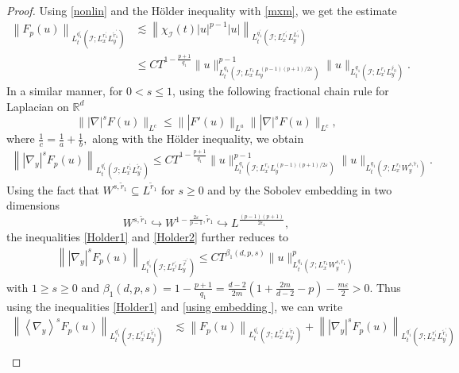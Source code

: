 \documentclass[a4paper,11pt, reqno]{amsart}
\theoremstyle{definition}
\theoremstyle{remark}
\numberwithin{equation}{section}
\begin{document}
\begin{proof}
        Using \eqref{nonlin}  and the H\"older inequality with \eqref{mxm}, we get the estimate 
		\begin{align}\label{Holder1}\nonumber
			\left\|F_p(u)\right\|_{L_t^{q_1^{\prime}}\left(\mathcal{I} ; L_x^{r_1^{\prime}} L_y^{\tilde{r}_1^{\prime}}\right)} & \lesssim\left\|\chi_{\mathcal{I}}(t)|u|^{p-1} | u|\right\|_{L_t^{q_1^{\prime}}\left(\mathcal{I} ; L_x^{r_1^{\prime}} L_y^{L_1^{\prime}}\right)} \\
			&\leq C T^{1-\frac{p+1}{q_1}}\|u\|_{L_t^{q_1}\left(\mathcal{I} ; L_x^{r_1} L_y^{(p-1)(p+1) / 2 \varepsilon}\right)}^{p-1}\|u\|_{L_t^{q_1}\left(\mathcal{I} ; L_x^{r_1} L_y^{\tilde{r_0}}\right)}.
		\end{align}
	In a similar manner, for $0<s \leq 1$, using the following fractional chain rule for Laplacian on $\mathbb{R}^d$ $$\||\nabla|^s F(u)\|_{L^c}\leq \||F'(u)\|_{L^a}\||\nabla|^sF(u)\|_{L^c},$$
    where $\frac{1}{c}=\frac{1}{a}+\frac{1}{b},$ along with the H\"older inequality,  we obtain
		\begin{align}\label{Holder2}
			\left\|\left|\nabla_y\right|^s F_p(u)\right\|_{L_t^{q_1^{\prime}}\left(\mathcal{I} ; L_x^{r_1^{\prime}} L_y^{\tilde{r}_1}\right)} \leq C T^{1-\frac{p+1}{q_1}}\|u\|_{L_t^{q_1}\left(\mathcal{I} ; L_x^{r_1} L_y^{(p-1)(p+1) / 2 \varepsilon}\right)}^{p-1}\|u\|_{L_t^{q_1}\left(\mathcal{I} ; L_x^{r_1} W_y^{s, \tilde{r}_1}\right)}.
		\end{align}
		Using the fact that  $W^{s, \widetilde{r}_1} \subseteq L^{\widetilde{r}_1}$ for $s \geq 0$ and  by  the Sobolev embedding in two dimensions
		$$
		W^{s, \widetilde{r}_1} \hookrightarrow W^{1-\frac{2 \varepsilon}{p-1}, \widetilde{r}_1} \hookrightarrow L^{\frac{(p-1)(p+1)}{2 \epsilon_1}},
		$$
		the inequalities \eqref{Holder1} and \eqref{Holder2}  further   reduces to 
		\begin{align}\label{using embedding }
			\left\||\nabla_y|^s F_p(u)\right\|_{L_t^{q_1^{\prime}}\left(\mathcal{I} ; L_x^{r_1^{\prime}} L_y^{\vec{r}^{\prime}}\right)} \leq C T^{\beta_1(d, p, s)}\|u\|_{L_t^{q_1}\left(\mathcal{I} ; L_x^{r_1} W_y^{s, \bar{r}_1}\right)}^p
		\end{align}
		with $1 \geq  s \geq 0$ and $\beta_1(d, p, s)=1-\frac{p+1}{q_1} =\frac{d-2}{2m}\left(1+\frac{2m}{d-2}-p\right)-\frac{m\varepsilon}{2}>0.$
		Thus using the inequalities \eqref{Holder1} and \eqref{using embedding }, we can write 
		\begin{align}\label{For banach}\nonumber
			\left\|\left\langle\nabla_y\right\rangle^s F_p(u)\right\|_{L_t^{q_1^{\prime}}\left(\mathcal{I} ; L_x^{r_1^{\prime}} L_y^{\tilde{r}_1^{\prime}}\right)} &\lesssim\left\|F_p(u)\right\|_{L_t^{q_1^{\prime}}\left(\mathcal{I} ; L_x^{r_1^{\prime}} L_y^{\tilde{r}_1}\right)}+\left\|\left|\nabla_y\right|^s F_p(u)\right\|_{L_t^{q_1^{\prime}}\left(\mathcal{I} ; L_x^{r_1^{\prime}} L_y^{\tilde{r}_1^{\prime}}\right)} \\

\end{align}
\end{proof}
\end{document}
